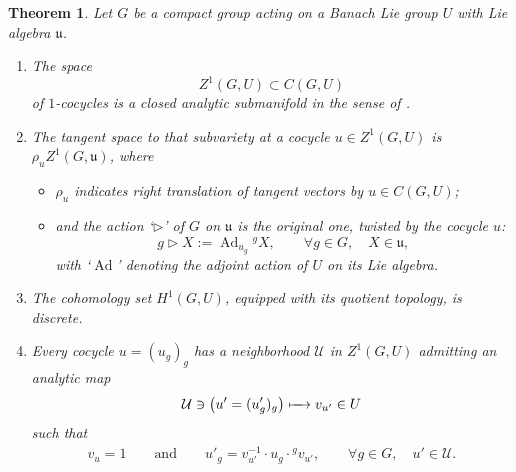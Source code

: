\documentclass[11pt]{article}
\numberwithin{equation}{section}
\numberwithin{equation}{section}
\newtheorem{Theorem}{Theorem}[section]
\newcommand\cU{{\mathcal U}}
\newcommand\fu{{\mathfrak u}}
\begin{document}
\begin{Theorem}\label{th:cocyle-man-1}
 Let $G$ be a compact group acting on a Banach Lie group $U$ with Lie algebra $\fu$.
 \begin{enumerate}[$(1)$]\itemsep=0pt
 \item\label{item:cocyle-man-1} The space
 \begin{equation*}
 Z^1(G,U)\subset C(G,U)
 \end{equation*}
 of $1$-cocycles is a closed analytic submanifold in the sense of {\rm \cite[\emph{Section}~5.8.3]{bourb-vars-17}}.

 \item\label{item:cocyle-man-1-tgz1} The tangent space to that subvariety at a cocycle $u\in Z^1(G,U)$ is $\rho_{u} Z^1(G,\fu)$, where
 \begin{itemize}\itemsep=0pt
 \item $\rho_{u}$ indicates right translation of tangent vectors by ${u}\in C(G,U)$;
 \item and the action `$\triangleright$' of $G$ on $\fu$ is the original one, twisted by the cocycle ${u}$:
 \begin{equation}\label{eq:defact}
 g\triangleright X:=\operatorname{Ad}_{u_g} {}^g X,\qquad \forall g\in G,\quad X\in \fu,
 \end{equation}
 with `$\operatorname{Ad}$' denoting the adjoint action of $U$ on its Lie algebra.
 \end{itemize}

 \item\label{item:cocyle-man-1-h1disc} The cohomology set $H^1(G,U)$, equipped with its quotient topology, is discrete.

\item\label{item:cocyle-man-1-coboundsplit} Every cocycle $u=(u_g)_g$ has a neighborhood $\cU$ in $Z^1(G,U)$ admitting an analytic map
 \begin{equation*}
 \cU\ni \left({u'}=(u'_g)_g\right)\xmapsto{\quad} v_{u'}\in U
 \end{equation*}
 such that
 \begin{align*}
 v_{u} =1\qquad\text{and}\qquad
 u'_g =v_{u'}^{-1}\cdot u_g\cdot {}^gv_{u'},\qquad \forall g\in G,\quad u'\in \cU.
 \end{align*}
 \end{enumerate}
\end{Theorem}
\end{document}
